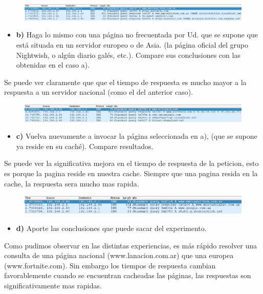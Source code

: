 \documentclass[12pt]{extarticle}
\providecommand{\tightlist}{%
      \setlength{\itemsep}{0pt}\setlength{\parskip}{0pt}}
\begin{document}
\begin{figure}
\centering
\includegraphics{images/server_nacional.png}
\caption{}
\end{figure}

\begin{itemize}
\tightlist
\item
  \textbf{b)} Haga lo mismo con una página no frecuentada por Ud. que se
  supone que está situada en un servidor europeo o de Asia. (la página
  oficial del grupo Nightwish, o algún diario galés, etc.). Compare sus
  conclusiones con las obtenidas en el caso a).
\end{itemize}

Se puede ver claramente que que el tiempo de respuesta es mucho mayor a
la respuesta a un servidor nacional (como el del anterior caso).

\begin{figure}
\centering
\includegraphics{images/server_externo.png}
\caption{}
\end{figure}

\begin{itemize}
\tightlist
\item
  \textbf{c)} Vuelva nuevamente a invocar la página seleccionada en a),
  (que se supone ya reside en su caché). Compare resultados.
\end{itemize}

Se puede ver la significativa mejora en el tiempo de respuesta de la
peticion, esto es porque la pagina reside en nuestra cache. Siempre que
una pagina resida en la cache, la respuesta sera mucho mas rapida.

\begin{figure}
\centering
\includegraphics{images/cacheada.png}
\caption{}
\end{figure}

\begin{itemize}
\tightlist
\item
  \textbf{d)} Aporte las conclusiones que puede sacar del experimento.
\end{itemize}

Como pudimos observar en las distintas experiencias, es más rápido
resolver una consulta de una página nacional (www.lanacion.com.ar) que
una europea (www.fortnite.com). Sin embargo los tiempos de respuesta
cambian favorablemente cuando se encuentran cacheadas las páginas, las
respuestas son significativamente mas rapidas.


    
    



    
    
\end{document}
